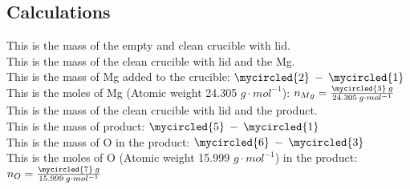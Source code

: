 \documentclass[main.tex]{subfiles}
\begin{document}
 \subsection*{Calculations}
 This is the mass of the empty and clean crucible with lid.\vspace{0.5cm}\\
 This is the mass of the clean crucible with lid and the Mg.\vspace{0.5cm}\\
 This is the mass of Mg added to the crucible: $\mycircled{2}\: - \: \mycircled{1}$ \vspace{0.5cm}\\
 This is the moles of Mg (Atomic weight 24.305 $g\cdot mol^{-1}$):
$n_{Mg}=\frac{\mycircled{3}\: g}{24.305 \: g\cdot mol^{-1}}$\vspace{0.5cm}\\
 This is the mass of the clean crucible with lid and the product.\vspace{0.5cm}\\
 This is the mass of product: $\mycircled{5} \: - \: \mycircled{1}$ \vspace{0.5cm}\\
 This is the mass of O in the product: $\mycircled{6} \: - \: \mycircled{3} $ \vspace{0.5cm}\\
 This is the moles of O (Atomic weight 15.999 $g\cdot mol^{-1}$) in the product: $n_{O}=\frac{\mycircled{7} \:g}{15.999 \:g\cdot mol^{-1}}$


 
\end{document}
